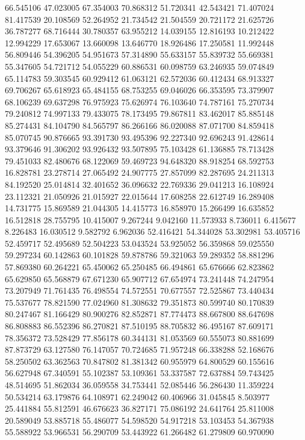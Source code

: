 66.545106
47.023005
67.354003
70.868312
51.720341
42.543421
71.407024
81.417539
20.108569
52.264952
21.734542
21.504559
20.721172
21.625726
36.787277
68.716444
30.780357
63.955212
14.039155
12.816193
10.212422
12.994229
17.653067
13.660098
13.646770
18.926486
17.250581
11.992448
56.809446
54.396205
54.951673
57.314890
55.633157
55.839732
55.669381
55.347605
54.721712
54.055229
60.886531
60.098759
63.246935
59.074849
65.114783
59.303545
60.929412
61.063121
62.572036
60.412434
68.913327
69.706267
65.618923
65.484155
68.753255
69.046026
66.353595
73.379907
68.106239
69.637298
76.975923
75.626974
76.103640
74.787161
75.270734
79.240812
74.997133
79.433075
78.173495
79.867811
83.462017
85.885148
85.274431
84.104790
84.565797
86.266166
86.020088
87.071700
84.859418
85.070745
90.876665
93.391730
93.495396
92.227340
92.696243
91.428614
93.379646
91.306202
93.926432
93.507895
75.103428
61.136885
78.713428
79.451033
82.480676
68.122069
59.469723
94.648320
88.918254
68.592753
16.828781
23.278714
27.065492
24.907775
27.857099
82.287695
24.211313
84.192520
25.014814
32.401652
36.096632
22.769336
29.041213
16.108924
23.112321
21.050926
21.015927
22.015644
17.608258
22.612749
16.289408
14.731775
15.869589
21.044305
14.415773
16.858970
15.266499
16.635852
16.512818
28.755795
10.415007
9.267244
9.042160
11.573933
8.736011
6.415677
8.226483
16.030512
9.582792
6.962036
52.416421
54.344028
53.302981
53.405716
52.459717
52.495689
52.504223
53.043524
53.925052
56.359868
59.025550
59.297234
60.142863
60.101828
59.878786
59.321063
59.289352
58.881296
57.869380
60.264221
65.450062
65.250485
66.494861
65.676666
62.823862
65.629850
65.568879
67.671230
65.907712
67.654974
73.241448
74.247954
73.207949
71.761435
76.498554
74.572551
70.677557
72.525867
73.440434
75.537677
78.821590
77.024960
81.308632
79.351873
80.599740
80.170839
80.247467
81.166429
80.900276
82.852871
87.774473
88.667800
88.647698
86.808883
86.552396
86.270821
87.510195
88.705832
86.495167
87.609171
78.356372
73.528429
77.856178
60.344131
81.053569
60.555073
80.881699
87.873729
63.127580
76.147057
70.724685
71.957248
66.338288
52.168676
58.250502
63.362563
70.847802
81.381342
60.955979
64.800529
60.155616
56.627948
67.340591
55.102387
53.109361
53.337587
72.637884
59.743425
48.514695
51.862034
36.059558
34.753441
52.085446
56.286430
11.359224
50.534214
63.179876
64.108971
62.249042
60.406966
31.045845
8.503977
25.441884
55.812591
46.676623
36.827171
75.086192
24.641764
25.811008
20.589049
53.885718
55.486077
54.598520
54.917218
53.103453
54.367938
55.588922
53.966531
56.290709
53.443922
61.266482
61.279809
60.970090
